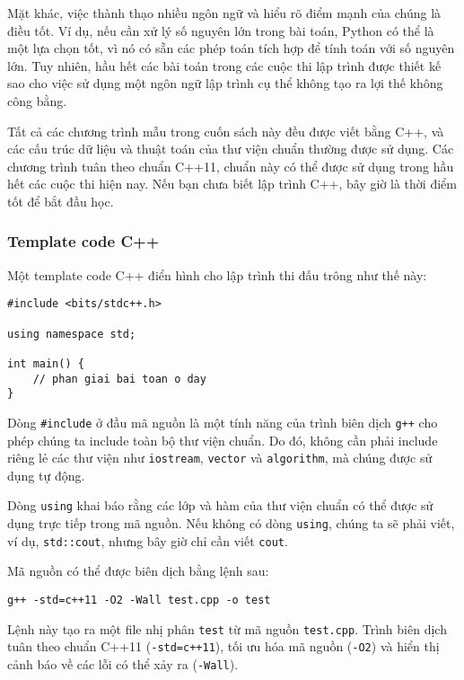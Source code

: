 Mặt khác, việc thành thạo
nhiều ngôn ngữ và hiểu rõ
điểm mạnh của chúng là điều tốt.
Ví dụ, nếu cần xử lý số nguyên lớn
trong bài toán,
Python có thể là một lựa chọn tốt, vì nó
có sẵn các phép toán tích hợp để
tính toán với số nguyên lớn.
Tuy nhiên, hầu hết các bài toán trong các cuộc thi lập trình
được thiết kế sao cho
việc sử dụng một ngôn ngữ lập trình cụ thể
không tạo ra lợi thế không công bằng.

Tất cả các chương trình mẫu trong cuốn sách này đều được viết bằng C++,
và các cấu trúc dữ liệu và thuật toán
của thư viện chuẩn thường được sử dụng.
Các chương trình tuân theo chuẩn C++11,
chuẩn này có thể được sử dụng trong hầu hết các cuộc thi hiện nay.
Nếu bạn chưa biết lập trình C++,
bây giờ là thời điểm tốt để bắt đầu học.

\subsubsection{Template code C++}

Một template code C++ điển hình cho lập trình thi đấu
trông như thế này:

\begin{lstlisting}
#include <bits/stdc++.h>

using namespace std;

int main() {
    // phan giai bai toan o day
}
\end{lstlisting}

Dòng \texttt{\#include} ở đầu
mã nguồn là một tính năng của trình biên dịch \texttt{g++}
cho phép chúng ta include toàn bộ thư viện chuẩn.
Do đó, không cần phải include riêng lẻ
các thư viện như \texttt{iostream},
\texttt{vector} và \texttt{algorithm},
mà chúng được sử dụng tự động.

Dòng \texttt{using} khai báo rằng
các lớp và hàm
của thư viện chuẩn có thể được sử dụng trực tiếp
trong mã nguồn.
Nếu không có dòng \texttt{using}, chúng ta sẽ phải
viết, ví dụ, \texttt{std::cout},
nhưng bây giờ chỉ cần viết \texttt{cout}.

Mã nguồn có thể được biên dịch bằng lệnh sau:

\begin{lstlisting}
g++ -std=c++11 -O2 -Wall test.cpp -o test
\end{lstlisting}

Lệnh này tạo ra một file nhị phân \texttt{test}
từ mã nguồn \texttt{test.cpp}.
Trình biên dịch tuân theo chuẩn C++11
(\texttt{-std=c++11}),
tối ưu hóa mã nguồn (\texttt{-O2})
và hiển thị cảnh báo về các lỗi có thể xảy ra (\texttt{-Wall}).

